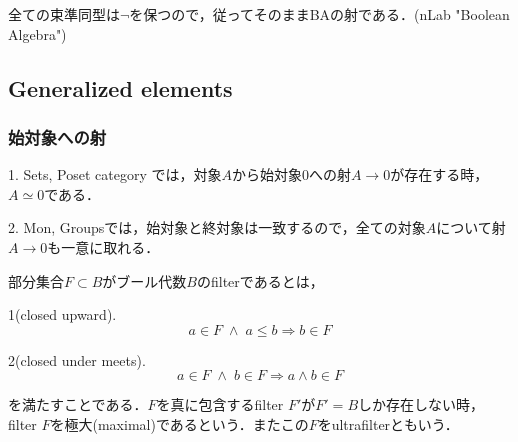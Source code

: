 \documentclass[uplatex, 12pt, dvipdfmx]{jsarticle}
\begin{document}
\begin{proposition*}
    全ての束準同型は$\lnot$を保つので，従ってそのままBAの射である．(nLab "Boolean Algebra")
\end{proposition*}

\subsection{Generalized elements}\label{subsection-generalized-elements}

\subsubsection*{始対象への射}

\begin{example*}
    1. Sets, Poset category では，対象$A$から始対象$0$への射$A\to 0$が存在する時，$A\simeq 0$である．

    2. Mon, Groupsでは，始対象と終対象は一致するので，全ての対象$A$について射$A\to 0$も一意に取れる．
\end{example*}

\begin{definition*}[ultrafilter]
    部分集合$F\subset B$がブール代数$B$のfilterであるとは，

    1(closed upward). \begin{equation}\label{formula-BAfilter-closed-upward}
        a\in F\;\land\; a\le b\Rightarrow b\in F
    \end{equation}

    2(closed under meets). \begin{equation}\label{formula-BAfilter-closed-under-meets}
        a\in F\;\land\; b\in F\Rightarrow a\land b\in F
    \end{equation}
    
    を満たすことである．$F$を真に包含するfilter $F'$が$F'=B$しか存在しない時，filter $F$を極大(maximal)であるという．またこの$F$をultrafilterともいう．
\end{definition*}
\end{document}

